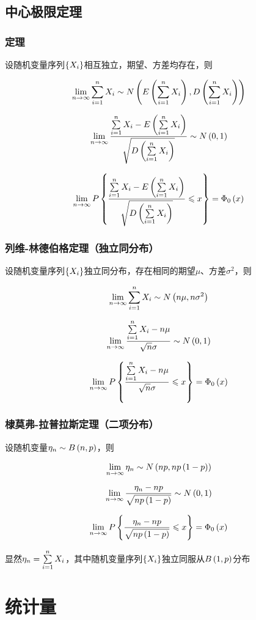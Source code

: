 \documentclass{article}
\begin{document}
\subsection{中心极限定理}

\subsubsection{定理}

设随机变量序列$\left\{X_i\right\}$相互独立，期望、方差均存在，则

\[\lim_{n\to\infty}\sum\limits_{i=1}^n X_i\sim N\left(E\left(\sum\limits_{i=1}^n X_i\right),D\left(\sum\limits_{i=1}^n X_i\right)\right)\]

\[\lim_{n\to\infty}\frac{\sum\limits_{i=1}^n X_i-E\left(\sum\limits_{i=1}^n X_i\right)}{\sqrt{D\left(\sum\limits_{i=1}^n X_i\right)}}\sim N\left(0,1\right)\]

\[\lim_{n\to\infty}P\left\{\frac{\sum\limits_{i=1}^n X_i-E\left(\sum\limits_{i=1}^n X_i\right)}{\sqrt{D\left(\sum\limits_{i=1}^n X_i\right)}}\leqslant x\right\}=\Phi_0\left(x\right)\]

\subsubsection{列维-林德伯格定理（独立同分布）}

设随机变量序列$\left\{X_i\right\}$独立同分布，存在相同的期望$\mu$、方差$\sigma^2$，则

\[\lim_{n\to\infty}\sum\limits_{i=1}^n X_i\sim N\left(n\mu,n\sigma^2\right)\]

\[\lim_{n\to\infty}\frac{\sum\limits_{i=1}^n X_i-n\mu}{\sqrt n\sigma}\sim N\left(0,1\right)\]

\[\lim_{n\to\infty}P\left\{\frac{\sum\limits_{i=1}^n X_i-n\mu}{\sqrt n\sigma}\leqslant x\right\}=\Phi_0\left(x\right)\]

\subsubsection{棣莫弗-拉普拉斯定理（二项分布）}

设随机变量$\eta_n\sim B\left(n,p\right)$，则

\[\lim_{n\to\infty}\eta_n\sim N\left(np,np\left(1-p\right)\right)\]

\[\lim_{n\to\infty}\frac{\eta_n-np}{\sqrt{np\left(1-p\right)}}\sim N\left(0,1\right)\]

\[\lim_{n\to\infty}P\left\{\frac{\eta_n-np}{\sqrt{np\left(1-p\right)}}\leqslant x\right\}=\Phi_0\left(x\right)\]

显然$\eta_n=\sum\limits_{i=1}^n X_i$，其中随机变量序列$\left\{X_i\right\}$独立同服从$B\left(1,p\right)$分布

\section{统计量}
\end{document}
